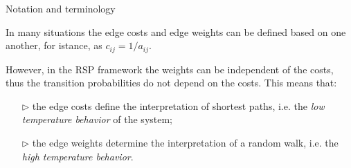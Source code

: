 \documentclass[13pt]{beamer}
\begin{document}
\begin{frame}[t,allowframebreaks]{Notation and terminology}
\begin{itemize}

        \end{itemize}

        In many situations the edge costs and edge weights can be defined based on one another, for istance, as $c_{ij}=1/a_{ij}$. 

        However, in the RSP framework the weights can be independent of the costs, thus the transition probabilities do not depend on the costs. This means that:

        \begin{itemize}
            \item[$\triangleright$] the edge costs define the interpretation of shortest paths, i.e. the \emph{low temperature behavior} of the system;

            \item[$\triangleright$] the edge weights determine the interpretation of a random walk, i.e. the \emph{high temperature behavior}.
        \end{itemize}

    \end{frame}



\end{document}
